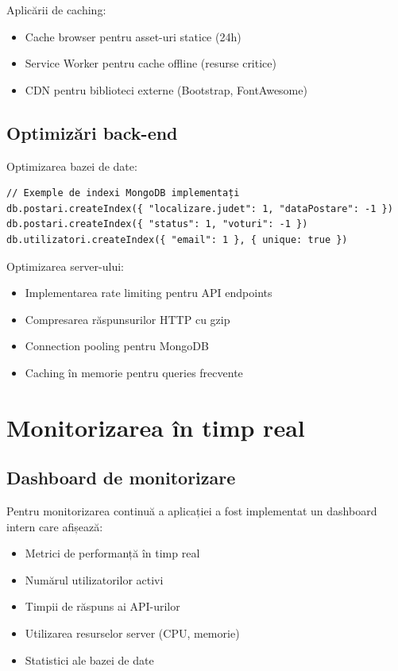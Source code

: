 \documentclass[12pt,a4paper]{report}
\begin{document}
Aplicării de caching:
\begin{itemize}
\item Cache browser pentru asset-uri statice (24h)
\item Service Worker pentru cache offline (resurse critice)
\item CDN pentru biblioteci externe (Bootstrap, FontAwesome)
\end{itemize}

\subsection{Optimizări back-end}

Optimizarea bazei de date:
\begin{verbatim}
// Exemple de indexi MongoDB implementați
db.postari.createIndex({ "localizare.judet": 1, "dataPostare": -1 })
db.postari.createIndex({ "status": 1, "voturi": -1 })
db.utilizatori.createIndex({ "email": 1 }, { unique: true })
\end{verbatim}

Optimizarea server-ului:
\begin{itemize}
\item Implementarea rate limiting pentru API endpoints
\item Compresarea răspunsurilor HTTP cu gzip
\item Connection pooling pentru MongoDB
\item Caching în memorie pentru queries frecvente
\end{itemize}

\section{Monitorizarea în timp real}

\subsection{Dashboard de monitorizare}

Pentru monitorizarea continuă a aplicației a fost implementat un dashboard intern care afișează:

\begin{itemize}
\item Metrici de performanță în timp real
\item Numărul utilizatorilor activi
\item Timpii de răspuns ai API-urilor
\item Utilizarea resurselor server (CPU, memorie)
\item Statistici ale bazei de date
\end{itemize}
\end{document}
